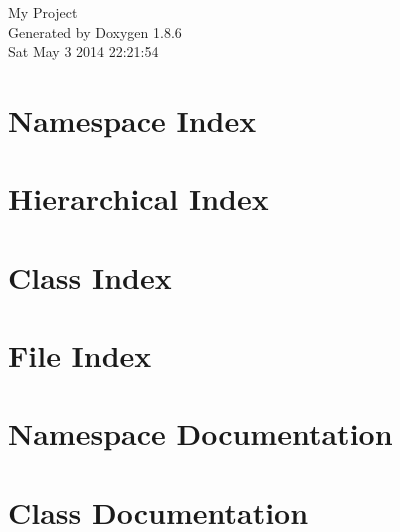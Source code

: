 \documentclass[twoside]{book}
\newcommand{\clearemptydoublepage}{%
  \newpage{\pagestyle{empty}\cleardoublepage}%
}
\begin{document}
\hypersetup{pageanchor=false}
\begin{titlepage}
\vspace*{7cm}
\begin{center}%
{\Large My Project }\\
\vspace*{1cm}
{\large Generated by Doxygen 1.8.6}\\
\vspace*{0.5cm}
{\small Sat May 3 2014 22:21:54}\\
\end{center}
\end{titlepage}
\clearemptydoublepage
\tableofcontents
\clearemptydoublepage
{}
\hypersetup{pageanchor=true}

\chapter{Namespace Index}

\chapter{Hierarchical Index}

\chapter{Class Index}

\chapter{File Index}

\chapter{Namespace Documentation}


\chapter{Class Documentation}


















\end{document}
